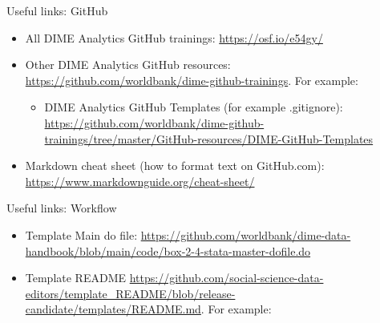 \documentclass[aspectratio=169]{beamer}
\newcommand{\trainingURL}[1]{{\color{blue}\url{#1}}}
\begin{document}
\begin{frame}{Useful links: GitHub}
	\begin{itemize}
		\item All DIME Analytics GitHub trainings: \trainingURL{https://osf.io/e54gy/}
		\item Other DIME Analytics GitHub resources: \trainingURL{https://github.com/worldbank/dime-github-trainings}. For example:
		\begin{itemize}
			\item DIME Analytics GitHub Templates (for example .gitignore): \trainingURL{https://github.com/worldbank/dime-github-trainings/tree/master/GitHub-resources/DIME-GitHub-Templates}
		\end{itemize}
		\item Markdown cheat sheet (how to format text on GitHub.com):  \trainingURL{https://www.markdownguide.org/cheat-sheet/}
	\end{itemize}
\end{frame}

\begin{frame}{Useful links: Workflow}
	\begin{itemize}
		\item Template Main do file: \trainingURL{https://github.com/worldbank/dime-data-handbook/blob/main/code/box-2-4-stata-master-dofile.do}
		\item Template README \trainingURL{https://github.com/social-science-data-editors/template_README/blob/release-candidate/templates/README.md}. For example:
	\end{itemize}
\end{frame}
\end{document}
